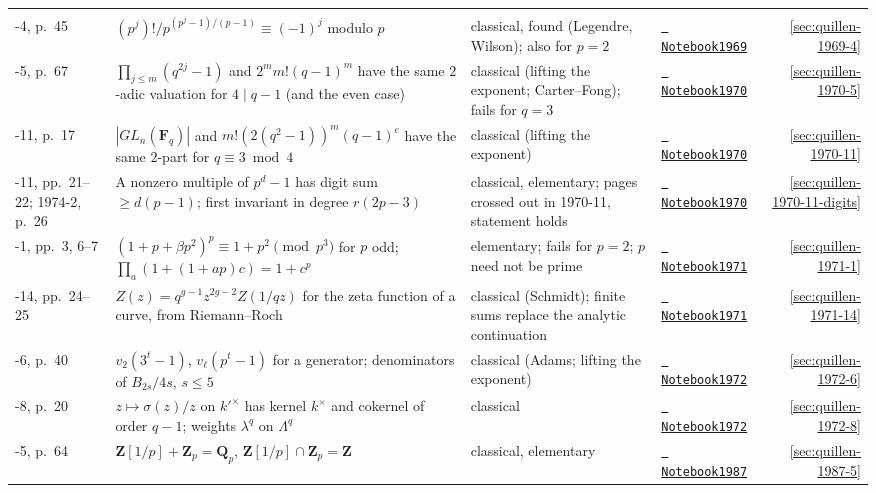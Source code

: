 \documentclass[11pt]{article}
\newcommand{\leanblobmain}{https://github.com/Commutator-IO/grothendieck-project/blob/main/lean/Quillen}
\theoremstyle{plain}
\theoremstyle{definition}
\theoremstyle{remark}
\renewcommand{\_}{\bkunderscore\allowbreak}
\let\origtexttt\texttt
\renewcommand{\texttt}[1]{\origtexttt{\XeTeXinterchartokenstate=1 #1}}
\begin{document}
\begin{center}
{\begin{longtable}{@{}>{\raggedright\arraybackslash}p{1.6cm}>{\raggedright\arraybackslash}p{5.6cm}>{\raggedright\arraybackslash}p{3.9cm}>{\raggedright\arraybackslash}p{2.6cm}r@{}}
\addlinespace\multicolumn{5}{@{}l@{}}{\textbf{Number theory and congruences}}\\*
1969-4, p.~45 & $(p^j)!/p^{(p^j-1)/(p-1)} \equiv (-1)^j$ modulo $p$ & classical, found (Legendre, Wilson); also for $p = 2$ & \href{\leanblobmain/Notebook1969_4.lean}{\texttt{Notebook1969\_4}} & \ref{sec:quillen-1969-4}\\
1970-5, p.~67 & $\prod_{j \le m}(q^{2j}-1)$ and $2^m m!(q-1)^m$ have the same $2$-adic valuation for $4 \mid q - 1$ (and the even case) & classical (lifting the exponent; Carter--Fong); fails for $q = 3$ & \href{\leanblobmain/Notebook1970_5.lean}{\texttt{Notebook1970\_5}} & \ref{sec:quillen-1970-5}\\
1970-11, p.~17 & $|GL_n(\mathbf F_q)|$ and $m!(2(q^2-1))^m(q-1)^e$ have the same $2$-part for $q \equiv 3 \bmod 4$ & classical (lifting the exponent) & \href{\leanblobmain/Notebook1970_11.lean}{\texttt{Notebook1970\_11}} & \ref{sec:quillen-1970-11}\\
1970-11, pp.~21--22; 1974-2, p.~26 & A nonzero multiple of $p^d - 1$ has digit sum $\ge d(p-1)$; first invariant in degree $r(2p - 3)$ & classical, elementary; pages crossed out in 1970-11, statement holds & \href{\leanblobmain/Notebook1970_11.lean}{\texttt{Notebook1970\_11}} & \ref{sec:quillen-1970-11-digits}\\
1971-1, pp.~3, 6--7 & $(1 + p + \beta p^2)^p \equiv 1 + p^2 \pmod{p^3}$ for $p$ odd; $\prod_a(1 + (1+ap)c) = 1 + c^p$ & elementary; fails for $p = 2$; $p$ need not be prime & \href{\leanblobmain/Notebook1971_1.lean}{\texttt{Notebook1971\_1}} & \ref{sec:quillen-1971-1}\\
1971-14, pp.~24--25 & $Z(z) = q^{g-1}z^{2g-2}Z(1/qz)$ for the zeta function of a curve, from Riemann--Roch & classical (Schmidt); finite sums replace the analytic continuation & \href{\leanblobmain/Notebook1971_14.lean}{\texttt{Notebook1971\_14}} & \ref{sec:quillen-1971-14}\\
1972-6, p.~40 & $v_2(3^t - 1)$, $v_\ell(p^t - 1)$ for a generator; denominators of $B_{2s}/4s$, $s \le 5$ & classical (Adams; lifting the exponent) & \href{\leanblobmain/Notebook1972_6.lean}{\texttt{Notebook1972\_6}} & \ref{sec:quillen-1972-6}\\
1972-8, p.~20 & $z \mapsto \sigma(z)/z$ on $k'^\times$ has kernel $k^\times$ and cokernel of order $q - 1$; weights $\lambda^q$ on $\Lambda^q$ & classical & \href{\leanblobmain/Notebook1972_8.lean}{\texttt{Notebook1972\_8}} & \ref{sec:quillen-1972-8}\\
1987-5, p.~64 & $\mathbf Z[1/p] + \mathbf Z_p = \mathbf Q_p$, $\mathbf Z[1/p] \cap \mathbf Z_p = \mathbf Z$ & classical, elementary & \href{\leanblobmain/Notebook1987_5.lean}{\texttt{Notebook1987\_5}} & \ref{sec:quillen-1987-5}\\

\end{longtable}}
\end{center}
\end{document}

